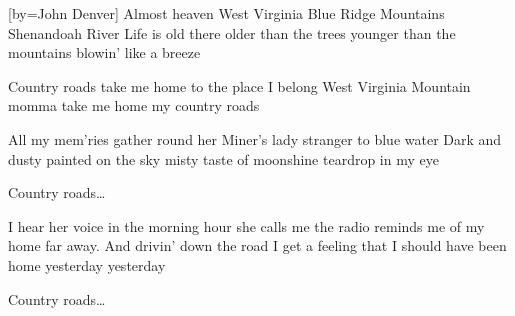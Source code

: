 [by={John Denver}]
\beginverse
Almost heaven
West Virginia 
Blue Ridge Mountains
Shenandoah River
Life is old there
older than the trees 
younger than the mountains
blowin' like a breeze
\endverse

\beginchorus
Country roads
take me home 
to the place I belong
West Virginia
Mountain momma
take me home
my country roads
\endchorus

\beginverse
All my mem'ries 
gather round her
Miner's lady
stranger to blue water
Dark and dusty
painted on the sky
misty taste of moonshine
teardrop in my eye
\endverse

\beginchorus
Country roads\dots
\endchorus

\beginverse
I hear her voice in the morning hour 
she calls me
the radio reminds me of my home 
far away.
And drivin' down the road I get a feeling 
that I should have been home yesterday
yesterday
\endverse

\beginchorus
Country roads\dots
\endchorus
\endsong
